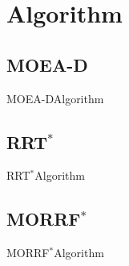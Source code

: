 \section{Algorithm}

\subsection{MOEA-D}

\begin{frame}{MOEA-D}{Algorithm}
\end{frame}

\subsection{RRT$^{*}$}

\begin{frame}{RRT$^{*}$}{Algorithm}
\end{frame}

\subsection{MORRF$^{*}$}

\begin{frame}{MORRF$^{*}$}{Algorithm}
\end{frame}